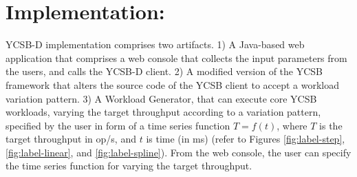 \documentclass[conference]{IEEEtran}
\begin{document}
\section{Implementation:}
 \def\tuple#1{\langle #1\rangle}
  YCSB-D implementation comprises two artifacts.
  1) A Java-based web application that comprises a web console that collects the input parameters from the users, and calls the YCSB-D client.
   2) A modified version of the YCSB framework that alters the source code of the YCSB client to accept a workload variation pattern.
       3) A Workload Generator, that can execute core YCSB workloads, varying the target throughput according to a
       variation pattern, specified by the user in form of a time series function $T=f(t)$, where $T$ is the target throughput in op/s, and $t$ is time (in ms) (refer to Figures \ref{fig:label-step}, \ref{fig:label-linear}, and \ref{fig:label-spline}). %
        From the web console, the user can specify the time series function for varying the target throughput. %
\end{document}
